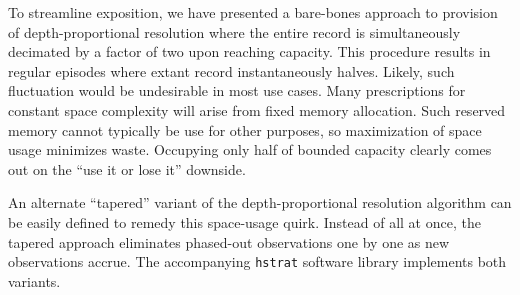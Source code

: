 To streamline exposition, we have presented a bare-bones approach to provision of depth-proportional resolution where the entire record is simultaneously decimated by a factor of two upon reaching capacity.
This procedure results in regular episodes where extant record instantaneously halves.
Likely, such fluctuation would be undesirable in most use cases.
Many prescriptions for constant space complexity will arise from fixed memory allocation.
Such reserved memory cannot typically be use for other purposes, so maximization of space usage minimizes waste.
Occupying only half of bounded capacity clearly comes out on the ``use it or lose it'' downside.

An alternate ``tapered'' variant of the depth-proportional resolution algorithm can be easily defined to remedy this space-usage quirk.
Instead of all at once, the tapered approach eliminates phased-out observations one by one as new observations accrue.
The accompanying \texttt{hstrat} software library implements both variants.





